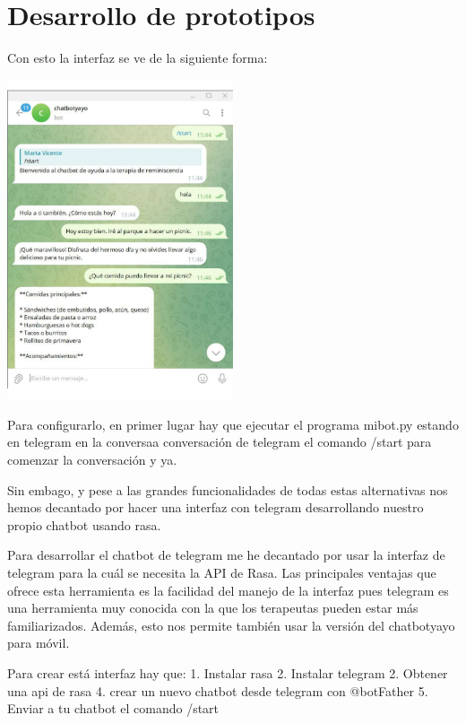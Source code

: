\chapter{Desarrollo de prototipos}
\label{cap:Desarrollo de prototipos}

Con esto la interfaz se ve de la siguiente forma: 

\includegraphics[width=0.5\textwidth]{Imagenes/telegram1}

Para configurarlo, en primer lugar hay que ejecutar el programa mibot.py estando en telegram en la conversaa conversación de telegram el comando /start para comenzar la conversación y ya. 

Sin embago, y pese a las grandes funcionalidades de todas estas alternativas nos hemos decantado por hacer una interfaz con telegram desarrollando nuestro propio chatbot usando rasa. 

Para desarrollar el chatbot de telegram me he decantado por usar la interfaz de telegram para la cuál se necesita la API de Rasa. Las principales ventajas que ofrece esta herramienta es la facilidad del manejo de la interfaz pues telegram es una herramienta muy conocida con la que los terapeutas pueden estar más familiarizados. Además, esto nos permite también usar la versión del chatbotyayo para móvil. 

Para crear está interfaz hay que: 
1. Instalar rasa
2. Instalar telegram 
2. Obtener una api de rasa
4. crear un nuevo chatbot desde telegram con @botFather
5. Enviar a tu chatbot el comando /start

